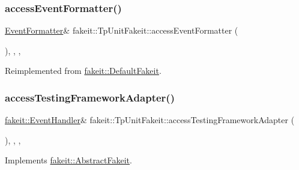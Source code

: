 \subsubsection{\texorpdfstring{accessEventFormatter()}{accessEventFormatter()}\hspace{0.1cm}{\footnotesize\ttfamily [2/2]}}
{\footnotesize\ttfamily \mbox{\hyperlink{structfakeit_1_1EventFormatter}{Event\+Formatter}}\& fakeit\+::\+Tp\+Unit\+Fakeit\+::access\+Event\+Formatter (\begin{DoxyParamCaption}{ }\end{DoxyParamCaption})\hspace{0.3cm}{\ttfamily [inline]}, {\ttfamily [override]}, {\ttfamily [protected]}, {\ttfamily [virtual]}}



Reimplemented from \mbox{\hyperlink{classfakeit_1_1DefaultFakeit_a02cb8f08a94e7bf830c87f74f20c9bd9}{fakeit\+::\+Default\+Fakeit}}.

\mbox{\label{classfakeit_1_1TpUnitFakeit_a38a83890a6d647457022347cd2a42aaf}} 
\subsubsection{\texorpdfstring{accessTestingFrameworkAdapter()}{accessTestingFrameworkAdapter()}\hspace{0.1cm}{\footnotesize\ttfamily [1/2]}}
{\footnotesize\ttfamily \mbox{\hyperlink{structfakeit_1_1EventHandler}{fakeit\+::\+Event\+Handler}}\& fakeit\+::\+Tp\+Unit\+Fakeit\+::access\+Testing\+Framework\+Adapter (\begin{DoxyParamCaption}{ }\end{DoxyParamCaption})\hspace{0.3cm}{\ttfamily [inline]}, {\ttfamily [override]}, {\ttfamily [protected]}, {\ttfamily [virtual]}}



Implements \mbox{\hyperlink{classfakeit_1_1AbstractFakeit_a9476180a503524d49d1978fbbc125b01}{fakeit\+::\+Abstract\+Fakeit}}.

\mbox{\label{classfakeit_1_1TpUnitFakeit_a38a83890a6d647457022347cd2a42aaf}} 
